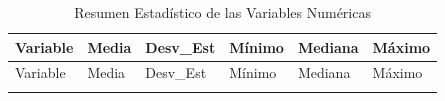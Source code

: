 \documentclass[
]{article}
\begin{document}
\begin{longtable}[]{@{}
  >{\raggedright\arraybackslash}p{}
  >{\raggedleft\arraybackslash}p{}
  >{\raggedleft\arraybackslash}p{}
  >{\raggedleft\arraybackslash}p{}
  >{\raggedleft\arraybackslash}p{}
  >{\raggedleft\arraybackslash}p{}@{}}
\caption{Resumen Estadístico de las Variables Numéricas}\tabularnewline
\toprule\noalign{}
\begin{minipage}[b]{\linewidth}\raggedright
Variable
\end{minipage} & \begin{minipage}[b]{\linewidth}\raggedleft
Media
\end{minipage} & \begin{minipage}[b]{\linewidth}\raggedleft
Desv\_Est
\end{minipage} & \begin{minipage}[b]{\linewidth}\raggedleft
Mínimo
\end{minipage} & \begin{minipage}[b]{\linewidth}\raggedleft
Mediana
\end{minipage} & \begin{minipage}[b]{\linewidth}\raggedleft
Máximo
\end{minipage} \\
\midrule\noalign{}
\endfirsthead
\toprule\noalign{}
\begin{minipage}[b]{\linewidth}\raggedright
Variable
\end{minipage} & \begin{minipage}[b]{\linewidth}\raggedleft
Media
\end{minipage} & \begin{minipage}[b]{\linewidth}\raggedleft
Desv\_Est
\end{minipage} & \begin{minipage}[b]{\linewidth}\raggedleft
Mínimo
\end{minipage} & \begin{minipage}[b]{\linewidth}\raggedleft
Mediana
\end{minipage} & \begin{minipage}[b]{\linewidth}\raggedleft
Máximo
\end{minipage} \\
\midrule\noalign{}
\endhead
\bottomrule\noalign{}
\endlastfoot

\end{longtable}
\end{document}
